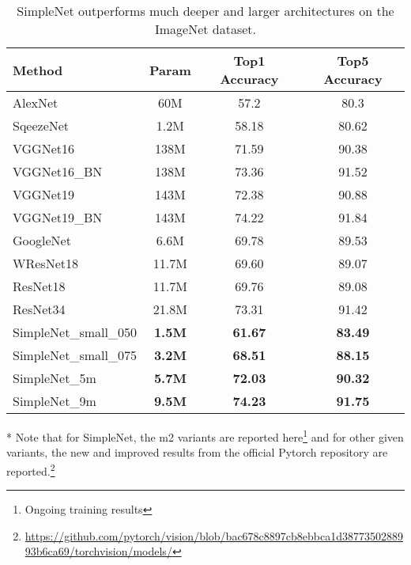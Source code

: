 \documentclass{article} \usepackage{lets_keepit_simple,times}
\begin{document}
\begin{table}[h!]
\caption{SimpleNet outperforms much deeper and larger architectures on the ImageNet dataset.}\label{tab:imagenet_experiment}
\begin{center}
\begin{tabular}{lccc}
\textbf{Method} & \textbf{Param} &\textbf{Top1 Accuracy} &\textbf{Top5 Accuracy}\\ \hline
AlexNet \cite{AlexKrizhevsky_imgnet_2012}   & 60M &	57.2 & 80.3 \\
SqeezeNet \cite{Iandola_squeezenet_2016}   & 1.2M &	58.18 & 80.62 \\
VGGNet16 \cite{Simonyan_VGG_2014}	& 138M & 71.59  & 90.38 \\
VGGNet16\_BN \cite{Simonyan_VGG_2014}	& 138M & 73.36 & 91.52 \\
VGGNet19 \cite{Simonyan_VGG_2014}	& 143M & 72.38 & 90.88 \\
VGGNet19\_BN \cite{Simonyan_VGG_2014}	& 143M & 74.22 & 91.84 \\
GoogleNet \cite{Szegedy_googlenet_2015}  & 6.6M &	69.78 & 89.53 \\
WResNet18 \cite{Zagoruyko_WRN_2016}  & 11.7M & 69.60 & 89.07\\
ResNet18 \cite{He_ResNet_2015}	& 11.7M &  69.76 & 89.08\\
ResNet34 \cite{He_ResNet_2015}	& 21.8M &  73.31 & 91.42\\
SimpleNet\_small\_050	& \textbf{1.5M} & \textbf{61.67} & \textbf{83.49}\\
SimpleNet\_small\_075	& \textbf{3.2M} & \textbf{68.51} & \textbf{88.15}\\
SimpleNet\_5m	& \textbf{5.7M} & \textbf{72.03} & \textbf{90.32}\\
SimpleNet\_9m & \textbf{9.5M} &	\textbf{74.23} & \textbf{91.75}\\\hline
\end{tabular}
\end{center}
\end{table}

* Note that for SimpleNet, the m2 variants are reported here\footnote{Ongoing training results} and for other given variants, the new and improved results from the official Pytorch\cite{paszke2019pytorch} repository are reported.\footnote{ \url{https://github.com/pytorch/vision/blob/bac678c8897cb8ebbca1d3877350288993b6ca69/torchvision/models/} }
\end{document}
